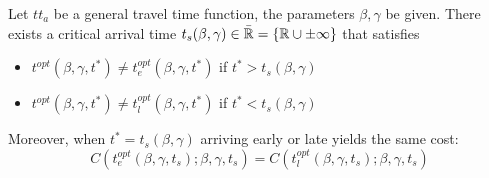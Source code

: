 \begin{prop}
  \label{prop:split-early-late}
  Let \(tt_a\) be a general travel time function, the parameters \(\beta, \gamma\) be given.
  There exists a critical arrival time \(t_s(\beta, \gamma) \in \bar{\mathbb{R}} = \{\mathbb{R} \cup \pm \infty\}\) that satisfies
  \begin{itemize}
  \item \(t^{opt}(\beta, \gamma, t^*) \neq t_e^{opt}(\beta, \gamma, t^*)\) if \(t^* > t_s(\beta, \gamma)\)
  \item \(t^{opt}(\beta, \gamma, t^*) \neq t_l^{opt}(\beta, \gamma, t^*)\) if \(t^* < t_s(\beta, \gamma)\)
  \end{itemize}

  Moreover, when \(t^* = t_s(\beta, \gamma)\) arriving early or late yields the same cost:
  \begin{equation*}
    C(t_e^{opt}(\beta, \gamma, t_s); \beta, \gamma, t_s) = C(t_l^{opt}(\beta, \gamma, t_s); \beta, \gamma, t_s)
  \end{equation*}
\end{prop}
